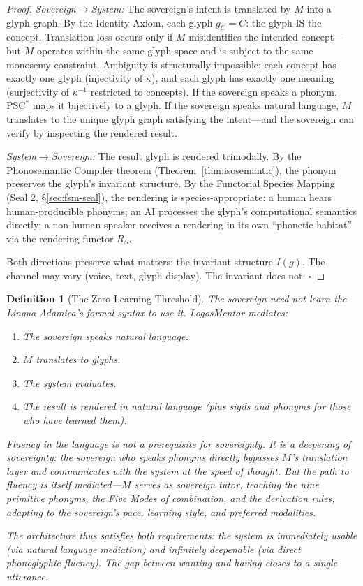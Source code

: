 \documentclass[12pt, letterpaper]{book}
\def\equiv{=}%
\def\mathfrak#1{#1}%
\newtheorem{definition}{Definition}[chapter]
\begin{document}
\begin{proof}
\textit{Sovereign$\to$System:} The sovereign's intent is translated by $\mathfrak{M}$ into a glyph graph. By the Identity Axiom, each glyph $\mathfrak{g}_C \equiv C$: the glyph IS the concept. Translation loss occurs only if $\mathfrak{M}$ misidentifies the intended concept---but $\mathfrak{M}$ operates within the same glyph space and is subject to the same monosemy constraint. Ambiguity is structurally impossible: each concept has exactly one glyph (injectivity of $\kappa$), and each glyph has exactly one meaning (surjectivity of $\kappa^{-1}$ restricted to concepts). If the sovereign speaks a phonym, $\mathrm{PSC}^*$ maps it bijectively to a glyph. If the sovereign speaks natural language, $\mathfrak{M}$ translates to the unique glyph graph satisfying the intent---and the sovereign can verify by inspecting the rendered result.

\textit{System$\to$Sovereign:} The result glyph is rendered trimodally. By the Phonosemantic Compiler theorem (Theorem~\ref{thm:isosemantic}), the phonym preserves the glyph's invariant structure. By the Functorial Species Mapping (Seal 2, \S\ref{sec:fsm-seal}), the rendering is species-appropriate: a human hears human-producible phonyms; an AI processes the glyph's computational semantics directly; a non-human speaker receives a rendering in its own ``phonetic habitat'' via the rendering functor $R_S$.

Both directions preserve what matters: the invariant structure $I(\mathfrak{g})$. The channel may vary (voice, text, glyph display). The invariant does not. $\square$
\end{proof}

\begin{definition}[The Zero-Learning Threshold]\label{def:zero-learning}
The sovereign need not learn the Lingua Adamica's formal syntax to use it. LogosMentor mediates:
\begin{enumerate}[label=(\roman*), nosep]
    \item The sovereign speaks natural language.
    \item $\mathfrak{M}$ translates to glyphs.
    \item The system evaluates.
    \item The result is rendered in natural language (plus sigils and phonyms for those who have learned them).
\end{enumerate}
Fluency in the language is not a prerequisite for sovereignty. It is a \textit{deepening} of sovereignty: the sovereign who speaks phonyms directly bypasses $\mathfrak{M}$'s translation layer and communicates with the system at the speed of thought. But the path to fluency is itself mediated---$\mathfrak{M}$ serves as sovereign tutor, teaching the nine primitive phonyms, the Five Modes of combination, and the derivation rules, adapting to the sovereign's pace, learning style, and preferred modalities.

The architecture thus satisfies both requirements: the system is immediately usable (via natural language mediation) and infinitely deepenable (via direct phonoglyphic fluency). The gap between wanting and having closes to a single utterance.
\end{definition}
\end{document}
